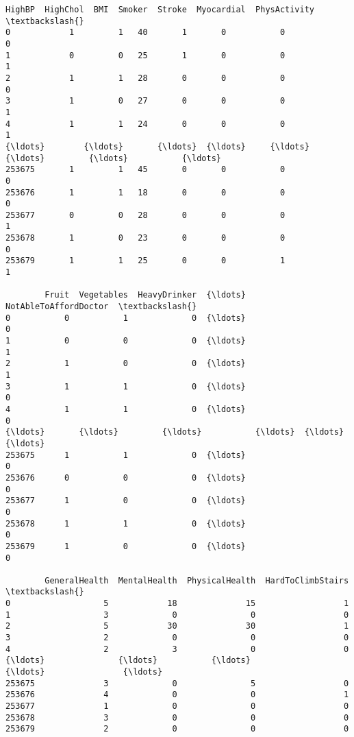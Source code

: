 \documentclass[11pt]{article}
\makeatletter
\newcommand{\boxspacing}{\kern\kvtcb@left@rule\kern\kvtcb@boxsep}
\newcommand{\prompt}[4]{
        {\ttfamily\llap{{\color{#2}[#3]:\hspace{3pt}#4}}\vspace{-\baselineskip}}
    }
\makeatother
\begin{document}
            \begin{tcolorbox}[breakable, size=fbox, boxrule=.5pt, pad at break*=1mm, opacityfill=0]
\prompt{Out}{outcolor}{66}{\boxspacing}
\begin{Verbatim}[commandchars=\\\{\}]
        HighBP  HighChol  BMI  Smoker  Stroke  Myocardial  PhysActivity  \textbackslash{}
0            1         1   40       1       0           0             0
1            0         0   25       1       0           0             1
2            1         1   28       0       0           0             0
3            1         0   27       0       0           0             1
4            1         1   24       0       0           0             1
{\ldots}        {\ldots}       {\ldots}  {\ldots}     {\ldots}     {\ldots}         {\ldots}           {\ldots}
253675       1         1   45       0       0           0             0
253676       1         1   18       0       0           0             0
253677       0         0   28       0       0           0             1
253678       1         0   23       0       0           0             0
253679       1         1   25       0       0           1             1

        Fruit  Vegetables  HeavyDrinker  {\ldots}  NotAbleToAffordDoctor  \textbackslash{}
0           0           1             0  {\ldots}                      0
1           0           0             0  {\ldots}                      1
2           1           0             0  {\ldots}                      1
3           1           1             0  {\ldots}                      0
4           1           1             0  {\ldots}                      0
{\ldots}       {\ldots}         {\ldots}           {\ldots}  {\ldots}                    {\ldots}
253675      1           1             0  {\ldots}                      0
253676      0           0             0  {\ldots}                      0
253677      1           0             0  {\ldots}                      0
253678      1           1             0  {\ldots}                      0
253679      1           0             0  {\ldots}                      0

        GeneralHealth  MentalHealth  PhysicalHealth  HardToClimbStairs  \textbackslash{}
0                   5            18              15                  1
1                   3             0               0                  0
2                   5            30              30                  1
3                   2             0               0                  0
4                   2             3               0                  0
{\ldots}               {\ldots}           {\ldots}             {\ldots}                {\ldots}
253675              3             0               5                  0
253676              4             0               0                  1
253677              1             0               0                  0
253678              3             0               0                  0
253679              2             0               0                  0


\end{Verbatim}
\end{tcolorbox}
\end{document}
